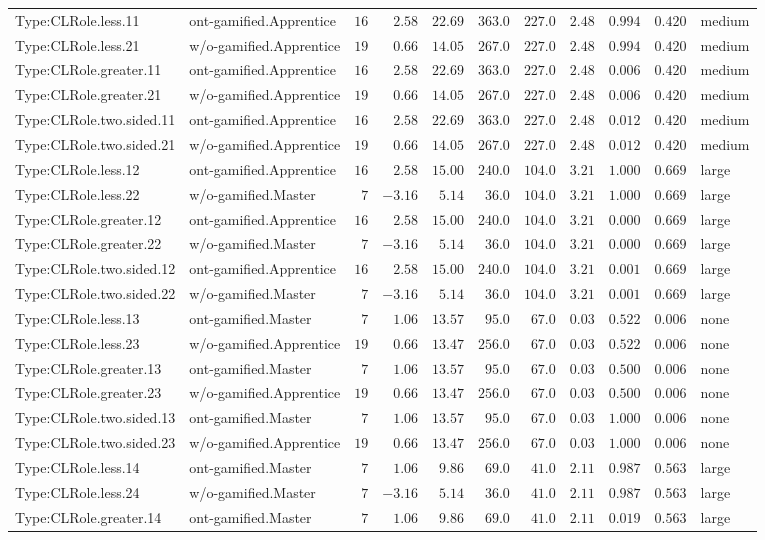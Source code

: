 \documentclass[6pt,a4paper]{article}
\begin{document}
{\begin{longtable}{llrrrrrrrrl}
Type:CLRole.less.11&ont-gamified.Apprentice&$16$&$ 2.58$&$22.69$&$363.0$&$227.0$&$2.48$&$0.994$&$0.420$&medium\tabularnewline
Type:CLRole.less.21&w/o-gamified.Apprentice&$19$&$ 0.66$&$14.05$&$267.0$&$227.0$&$2.48$&$0.994$&$0.420$&medium\tabularnewline
Type:CLRole.greater.11&ont-gamified.Apprentice&$16$&$ 2.58$&$22.69$&$363.0$&$227.0$&$2.48$&$0.006$&$0.420$&medium\tabularnewline
Type:CLRole.greater.21&w/o-gamified.Apprentice&$19$&$ 0.66$&$14.05$&$267.0$&$227.0$&$2.48$&$0.006$&$0.420$&medium\tabularnewline
Type:CLRole.two.sided.11&ont-gamified.Apprentice&$16$&$ 2.58$&$22.69$&$363.0$&$227.0$&$2.48$&$0.012$&$0.420$&medium\tabularnewline
Type:CLRole.two.sided.21&w/o-gamified.Apprentice&$19$&$ 0.66$&$14.05$&$267.0$&$227.0$&$2.48$&$0.012$&$0.420$&medium\tabularnewline
Type:CLRole.less.12&ont-gamified.Apprentice&$16$&$ 2.58$&$15.00$&$240.0$&$104.0$&$3.21$&$1.000$&$0.669$&large\tabularnewline
Type:CLRole.less.22&w/o-gamified.Master&$ 7$&$-3.16$&$ 5.14$&$ 36.0$&$104.0$&$3.21$&$1.000$&$0.669$&large\tabularnewline
Type:CLRole.greater.12&ont-gamified.Apprentice&$16$&$ 2.58$&$15.00$&$240.0$&$104.0$&$3.21$&$0.000$&$0.669$&large\tabularnewline
Type:CLRole.greater.22&w/o-gamified.Master&$ 7$&$-3.16$&$ 5.14$&$ 36.0$&$104.0$&$3.21$&$0.000$&$0.669$&large\tabularnewline
Type:CLRole.two.sided.12&ont-gamified.Apprentice&$16$&$ 2.58$&$15.00$&$240.0$&$104.0$&$3.21$&$0.001$&$0.669$&large\tabularnewline
Type:CLRole.two.sided.22&w/o-gamified.Master&$ 7$&$-3.16$&$ 5.14$&$ 36.0$&$104.0$&$3.21$&$0.001$&$0.669$&large\tabularnewline
Type:CLRole.less.13&ont-gamified.Master&$ 7$&$ 1.06$&$13.57$&$ 95.0$&$ 67.0$&$0.03$&$0.522$&$0.006$&none\tabularnewline
Type:CLRole.less.23&w/o-gamified.Apprentice&$19$&$ 0.66$&$13.47$&$256.0$&$ 67.0$&$0.03$&$0.522$&$0.006$&none\tabularnewline
Type:CLRole.greater.13&ont-gamified.Master&$ 7$&$ 1.06$&$13.57$&$ 95.0$&$ 67.0$&$0.03$&$0.500$&$0.006$&none\tabularnewline
Type:CLRole.greater.23&w/o-gamified.Apprentice&$19$&$ 0.66$&$13.47$&$256.0$&$ 67.0$&$0.03$&$0.500$&$0.006$&none\tabularnewline
Type:CLRole.two.sided.13&ont-gamified.Master&$ 7$&$ 1.06$&$13.57$&$ 95.0$&$ 67.0$&$0.03$&$1.000$&$0.006$&none\tabularnewline
Type:CLRole.two.sided.23&w/o-gamified.Apprentice&$19$&$ 0.66$&$13.47$&$256.0$&$ 67.0$&$0.03$&$1.000$&$0.006$&none\tabularnewline
Type:CLRole.less.14&ont-gamified.Master&$ 7$&$ 1.06$&$ 9.86$&$ 69.0$&$ 41.0$&$2.11$&$0.987$&$0.563$&large\tabularnewline
Type:CLRole.less.24&w/o-gamified.Master&$ 7$&$-3.16$&$ 5.14$&$ 36.0$&$ 41.0$&$2.11$&$0.987$&$0.563$&large\tabularnewline
Type:CLRole.greater.14&ont-gamified.Master&$ 7$&$ 1.06$&$ 9.86$&$ 69.0$&$ 41.0$&$2.11$&$0.019$&$0.563$&large\tabularnewline

\end{longtable}}
\end{document}
